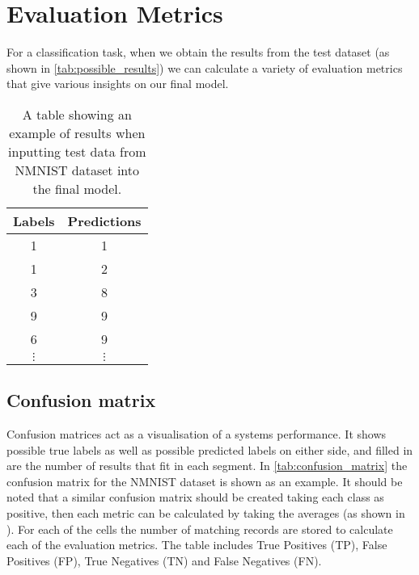 \section{Evaluation Metrics}

For a classification task, when we obtain the results from the test dataset (as shown in \autoref{tab:possible_results}) we can calculate a variety of evaluation metrics that give various insights on our final model.

\begin{table}[htb]
    \centering
    \begin{tabular}{|| c  | c ||}
        \hline
        Labels     & Predictions \\
        \hline \hline
        1          & 1           \\
        \hline
        1          & 2           \\
        \hline
        3          & 8           \\
        \hline
        9          & 9           \\
        \hline
        6          & 9           \\
        \hline
        $ \vdots $ & $ \vdots $  \\
    \end{tabular}
    \caption{A table showing an example of results when inputting test data from NMNIST dataset\cite{NMNIST} into the final model.}
    \label{tab:possible_results}
\end{table}

\subsection{Confusion matrix}

Confusion matrices act as a visualisation of a systems performance. It shows possible true labels as well as possible predicted labels on either side, and filled in are the number of results that fit in each segment. In \autoref{tab:confusion_matrix} the confusion matrix for the NMNIST dataset is shown as an example. It should be noted that a similar confusion matrix should be created taking each class as positive, then each metric can be calculated by taking the averages (as shown in ). For each of the cells the number of matching records are stored to calculate each of the evaluation metrics. The table includes True Positives (TP), False Positives (FP), True Negatives (TN) and False Negatives (FN).

